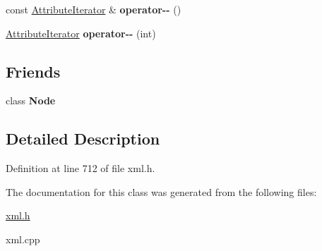 \begin{DoxyCompactItemize}
\item 
\hypertarget{classphys_1_1xml_1_1AttributeIterator_aa26f070fa194c529285bb094e23215de}{
const \hyperlink{classphys_1_1xml_1_1AttributeIterator}{AttributeIterator} \& {\bfseries operator-\/-\/} ()}
\label{de/d78/classphys_1_1xml_1_1AttributeIterator_aa26f070fa194c529285bb094e23215de}

\item 
\hypertarget{classphys_1_1xml_1_1AttributeIterator_ae46ebed7b404ae085c47984f615a7597}{
\hyperlink{classphys_1_1xml_1_1AttributeIterator}{AttributeIterator} {\bfseries operator-\/-\/} (int)}
\label{de/d78/classphys_1_1xml_1_1AttributeIterator_ae46ebed7b404ae085c47984f615a7597}

\end{DoxyCompactItemize}
\subsection*{Friends}
\begin{DoxyCompactItemize}
\item 
\hypertarget{classphys_1_1xml_1_1AttributeIterator_a6db9d28bd448a131448276ee03de1e6d}{
class {\bfseries Node}}
\label{de/d78/classphys_1_1xml_1_1AttributeIterator_a6db9d28bd448a131448276ee03de1e6d}

\end{DoxyCompactItemize}


\subsection{Detailed Description}


Definition at line 712 of file xml.h.



The documentation for this class was generated from the following files:\begin{DoxyCompactItemize}
\item 
\hyperlink{xml_8h}{xml.h}\item 
xml.cpp\end{DoxyCompactItemize}
